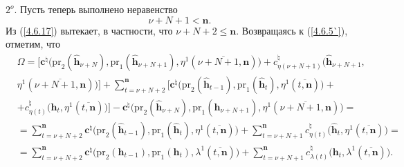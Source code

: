 \documentclass[12pt]{report}
\newcommand{\bfn}{\begin{equation}}
\newcommand{\efn}{\end{equation}}
\newcommand{\ov}{\overline}
\newcommand{\Om}{\Omega}
\newcommand{\la}{\lambda}
\newcommand{\zc}{{\mathbf c}}
\newcommand{\nn}{{\mathbf n}}
\begin{document}
{{$2^o.$ Пусть теперь выполнено неравенство
\bfn\label{4.6.17}\nu+N+1 < \nn.
\efn
Из (\ref{4.6.17}) вытекает, в частности, что $\nu+N+2 \leqslant \nn.$ Возвращаясь к (\ref{4.6.5`}), отметим, что
\begin{eqnarray}
&\Om = \bigl[\zc^\natural\bigl(\mathrm{pr}_2(\hat{\mathbf{h}}_{\nu+N}),\mathrm{pr}_1(\hat{\mathbf{h}}_{\nu+N+1}),
 \eta^1(\ov{\nu+N+1,\nn})\bigl) + c_{\eta(\nu+N+1)}^\natural\bigl(\hat{\mathbf{h}}_{\nu+N+1},
&\nonumber\\
&\eta^1(\ov{\nu+N+1,\nn})\bigl)\bigl] + \sum\limits_{t=\nu+N+2}^\nn\bigl[
\zc^\natural\bigl(\mathrm{pr}_2(\hat{\mathbf{h}}_{t-1}),\mathrm{pr}_1(\hat{\mathbf{h}}_t),
 \eta^1(\ov{t,\nn})\bigl) +
&\nonumber\\
&+ c_{\eta(t)}^\natural\bigl(\hat{\mathbf{h}}_t,\eta^1(\ov{t,\nn})\bigl)\bigl]-
\zc^\natural\bigl(\mathrm{pr}_2(\hat{\mathbf{h}}_{\nu+N}),\mathrm{pr}_1(\hat{\mathbf{h}}_{\nu+N+1}),
\eta^1(\ov{\nu+N+1,\nn})\bigl) =
&\nonumber\\
&= \sum\limits_{t=\nu+N+2}^\nn    \zc^\natural\bigl(\mathrm{pr}_2(\hat{\mathbf{h}}_{t-1}),
\mathrm{pr}_1(\hat{\mathbf{h}}_t),
\eta^1(\ov{t,\nn})\bigl) + \sum\limits_{t=\nu+N+1}^\nn c_{\eta(t)}^\natural\bigl(\hat{\mathbf{h}}_t,
\eta^1(\ov{t,\nn})\bigl) =
&\nonumber\\
&=  \sum\limits_{t=\nu+N+2}^\nn    \zc^\natural\bigl(\mathrm{pr}_2(\mathbf{h}_{t-1}),\mathrm{pr}_1(\mathbf{h}_t),
 \la^1(\ov{t,\nn})\bigl) +  \sum\limits_{t=\nu+N+1}^\nn c_{\la(t)}^\natural\bigl(\mathbf{h}_t, \la^1(\ov{t,\nn})\bigl).
&\label{4.6.18}
\end{eqnarray}

}}
\end{document}
